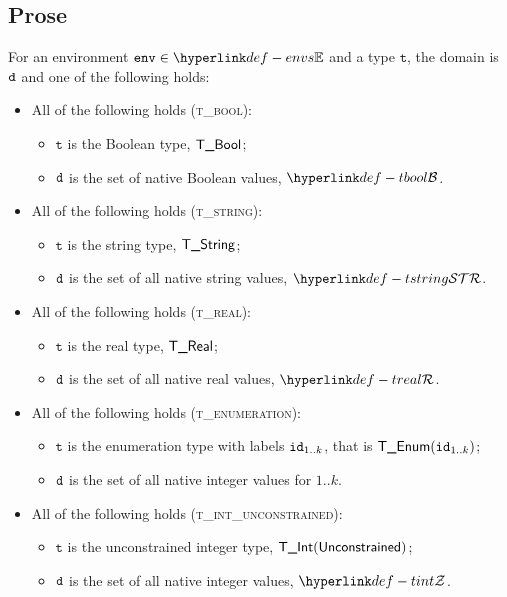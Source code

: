 \documentclass{book}
\newcommand\env[0]{\texttt{env}}
\newcommand\vt[0]{\texttt{t}}
\begin{document}
\subsection{Prose}
For an environment $\env \in \envs$ and a type $\vt$, the domain is $\texttt{d}$ and one of the following holds:
\begin{itemize}
  \item All of the following holds (\textsc{t\_bool}):
  \begin{itemize}
    \item $\vt$ is the Boolean type, $\textsf{T\_Bool}$;
    \item $\texttt{d}$ is the set of native Boolean values, $\tbool$.
  \end{itemize}

  \item All of the following holds (\textsc{t\_string}):
  \begin{itemize}
    \item $\vt$ is the string type, $\textsf{T\_String}$;
    \item $\texttt{d}$ is the set of all native string values, $\tstring$.
  \end{itemize}

  \item All of the following holds (\textsc{t\_real}):
  \begin{itemize}
    \item $\vt$ is the real type, $\textsf{T\_Real}$;
    \item $\texttt{d}$ is the set of all native real values, $\treal$.
  \end{itemize}

  \item All of the following holds (\textsc{t\_enumeration}):
  \begin{itemize}
    \item $\vt$ is the enumeration type with labels $\texttt{id}_{1..k}$, that is $\textsf{T\_Enum}(\texttt{id}_{1..k})$;
    \item $\texttt{d}$ is the set of all native integer values for $1..k$.
  \end{itemize}

  \item All of the following holds (\textsc{t\_int\_unconstrained}):
  \begin{itemize}
    \item $\vt$ is the unconstrained integer type, $\textsf{T\_Int}(\textsf{Unconstrained})$;
    \item $\texttt{d}$ is the set of all native integer values, $\tint$.
  \end{itemize}


\end{itemize}
\end{document}
